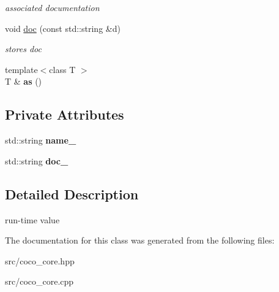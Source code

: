 \begin{DoxyCompactItemize}
\begin{DoxyCompactList}\small\item\em associated documentation \end{DoxyCompactList}\item 
\hypertarget{classcoco_1_1_attribute_base_aa58d9320fa9d8a368b1bb242b47a0d3e}{}void \hyperlink{classcoco_1_1_attribute_base_aa58d9320fa9d8a368b1bb242b47a0d3e}{doc} (const std\+::string \&d)\label{classcoco_1_1_attribute_base_aa58d9320fa9d8a368b1bb242b47a0d3e}

\begin{DoxyCompactList}\small\item\em stores doc \end{DoxyCompactList}\item 
\hypertarget{classcoco_1_1_attribute_base_a7a8d1f2d64f8087b5a582ca88aaaa7a9}{}{\footnotesize template$<$class T $>$ }\\T \& {\bfseries as} ()\label{classcoco_1_1_attribute_base_a7a8d1f2d64f8087b5a582ca88aaaa7a9}

\end{DoxyCompactItemize}
\subsection*{Private Attributes}
\begin{DoxyCompactItemize}
\item 
\hypertarget{classcoco_1_1_attribute_base_afcfc37b436c721506d1c70fa62cfdfc7}{}std\+::string {\bfseries name\+\_\+}\label{classcoco_1_1_attribute_base_afcfc37b436c721506d1c70fa62cfdfc7}

\item 
\hypertarget{classcoco_1_1_attribute_base_ab4f73c19a580d3c063757fb8573205eb}{}std\+::string {\bfseries doc\+\_\+}\label{classcoco_1_1_attribute_base_ab4f73c19a580d3c063757fb8573205eb}

\end{DoxyCompactItemize}


\subsection{Detailed Description}
run-\/time value 

The documentation for this class was generated from the following files\+:\begin{DoxyCompactItemize}
\item 
src/coco\+\_\+core.\+hpp\item 
src/coco\+\_\+core.\+cpp\end{DoxyCompactItemize}
